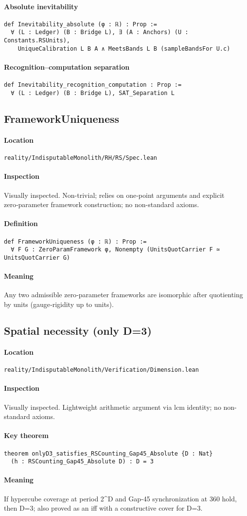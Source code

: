 \documentclass{article}
\newcommand{\FileRef}[1]{\texttt{#1}}
\newcommand{\ModuleHeader}[3]{%
  \subsection{#1}
  \paragraph{Location} \FileRef{#2}\\
  \paragraph{Inspection} #3
}
\begin{document}
\paragraph{Absolute inevitability}
\begin{lstlisting}
def Inevitability_absolute (φ : ℝ) : Prop :=
  ∀ (L : Ledger) (B : Bridge L), ∃ (A : Anchors) (U : Constants.RSUnits),
    UniqueCalibration L B A ∧ MeetsBands L B (sampleBandsFor U.c)
\end{lstlisting}

\paragraph{Recognition–computation separation}
\begin{lstlisting}
def Inevitability_recognition_computation : Prop :=
  ∀ (L : Ledger) (B : Bridge L), SAT_Separation L
\end{lstlisting}

\ModuleHeader{FrameworkUniqueness}{reality/IndisputableMonolith/RH/RS/Spec.lean}{Visually inspected. Non-trivial; relies on one‑point arguments and explicit zero‑parameter framework construction; no non-standard axioms.}
\paragraph{Definition}
\begin{lstlisting}
def FrameworkUniqueness (φ : ℝ) : Prop :=
  ∀ F G : ZeroParamFramework φ, Nonempty (UnitsQuotCarrier F ≃ UnitsQuotCarrier G)
\end{lstlisting}
\paragraph{Meaning} Any two admissible zero‑parameter frameworks are isomorphic after quotienting by units (gauge‑rigidity up to units).

\ModuleHeader{Spatial necessity (only D=3)}{reality/IndisputableMonolith/Verification/Dimension.lean}{Visually inspected. Lightweight arithmetic argument via lcm identity; no non-standard axioms.}
\paragraph{Key theorem}
\begin{lstlisting}
theorem onlyD3_satisfies_RSCounting_Gap45_Absolute {D : Nat}
  (h : RSCounting_Gap45_Absolute D) : D = 3
\end{lstlisting}
\paragraph{Meaning} If hypercube coverage at period 2^D and Gap‑45 synchronization at 360 hold, then D=3; also proved as an iff with a constructive cover for D=3.
\end{document}

